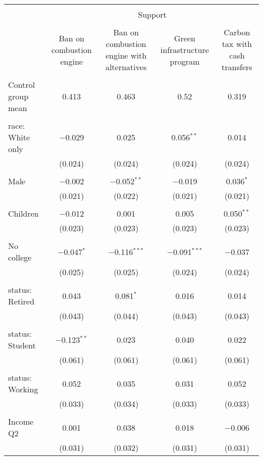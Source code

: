 
\begin{tabular}{@{\extracolsep{5pt}}lcccc} 
\\[-1.8ex]\hline 
\hline \\[-1.8ex] 
 & \multicolumn{4}{c}{Support} \\ 
\cline{2-5} 
\\[-1.8ex] & Ban on combustion engine & Ban on combustion engine with alternatives & Green infrastructure program & Carbon tax with cash transfers \\ 
\hline \\[-1.8ex] 
 Control group mean & 0.413 & 0.463 & 0.52 & 0.319  \\ \hline \\[-1.8ex] race: White only & $-$0.029 & 0.025 & 0.056$^{**}$ & 0.014 \\ 
  & (0.024) & (0.024) & (0.024) & (0.024) \\ 
  & & & & \\ 
 Male & $-$0.002 & $-$0.052$^{**}$ & $-$0.019 & 0.036$^{*}$ \\ 
  & (0.021) & (0.022) & (0.021) & (0.021) \\ 
  & & & & \\ 
 Children & $-$0.012 & 0.001 & 0.005 & 0.050$^{**}$ \\ 
  & (0.023) & (0.023) & (0.023) & (0.023) \\ 
  & & & & \\ 
 No college & $-$0.047$^{*}$ & $-$0.116$^{***}$ & $-$0.091$^{***}$ & $-$0.037 \\ 
  & (0.025) & (0.025) & (0.024) & (0.024) \\ 
  & & & & \\ 
 status: Retired & 0.043 & 0.081$^{*}$ & 0.016 & 0.014 \\ 
  & (0.043) & (0.044) & (0.043) & (0.043) \\ 
  & & & & \\ 
 status: Student & $-$0.123$^{**}$ & 0.023 & 0.040 & 0.022 \\ 
  & (0.061) & (0.061) & (0.061) & (0.061) \\ 
  & & & & \\ 
 status: Working & 0.052 & 0.035 & 0.031 & 0.052 \\ 
  & (0.033) & (0.034) & (0.033) & (0.033) \\ 
  & & & & \\ 
 Income Q2 & 0.001 & 0.038 & 0.018 & $-$0.006 \\ 
  & (0.031) & (0.032) & (0.031) & (0.031) \\ 

\end{tabular}
